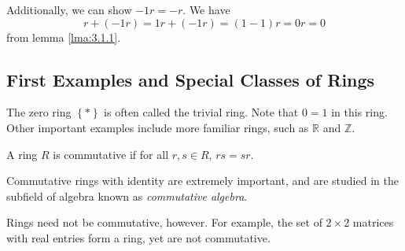 Additionally, we can show $-1r=-r$. We have
\[
	r + (-1r) = 1r + (-1r) = (1 - 1)r = 0r = 0
\]
from lemma \ref{lma:3.1.1}.
\subsection{First Examples and Special Classes of Rings}
The zero ring $\left\{ * \right\} $ is often called the trivial ring. Note that $0=1$ in this ring. Other important examples include more familiar rings, such as $\mathbb{R}$ and $\mathbb{Z}$.
\begin{definition}[Commutative]\label{dfn:3.1.2}
	A ring $R$ is commutative if for all $r,s\in R$, $rs=sr$.
\end{definition}
Commutative rings with identity are extremely important, and are studied in the subfield of algebra known as \emph{commutative algebra}.

Rings need not be commutative, however. For example, the set of $2\times 2$ matrices with real entries form a ring, yet are not commutative.

